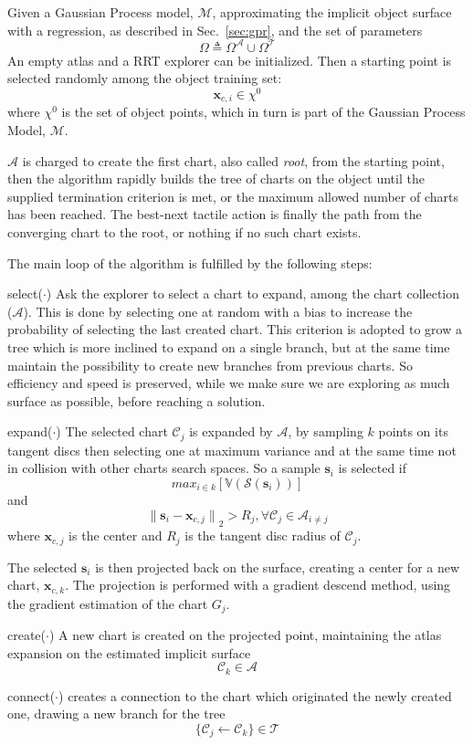 Given a Gaussian Process model, $\mathcal{M}$, approximating the implicit object surface
with a regression, as described in Sec.~\ref{sec:gpr}, and the set of parameters
$$\Omega \triangleq \Omega^{\mathcal{A}} \cup \Omega^{\mathcal{T}}$$
An empty atlas and a RRT explorer can be initialized.
Then a starting point is selected randomly among the object training set:
$$
\mathbf{x}_{c,i} \in \chi^0
$$
where $\chi^0$ is the set of object points,
which in turn is part of the Gaussian Process Model, $\mathcal{M}$.

$\mathcal{A}$ is charged to create the first chart, also called \emph{root}, from the starting point,
then the algorithm rapidly builds the tree of charts on the object until the supplied termination
criterion is met, or the maximum allowed number of charts has been reached.
The best-next tactile action is finally the path from the converging chart to the root, or nothing if no such chart exists.

The main loop of the algorithm is fulfilled by the following steps:\\
\begin{inparadesc}
\item[select($\cdot$)] Ask the explorer to select a chart to expand,
among the chart collection ($\mathcal{A}$).
This is done by selecting one at random with a bias to increase the probability
of selecting the last created chart. This criterion is adopted to grow a tree
which is more inclined to expand on a single branch, but at the same time maintain the
possibility to create new branches from previous charts. So efficiency and speed
is preserved, while we make sure we are exploring as much surface as possible,
before reaching a solution.\\
\item[expand($\cdot$)] The selected chart $\mathcal{C}_j$ is expanded by $\mathcal{A}$, by
sampling $k$ points on its tangent discs then selecting one at maximum variance
and at the same time not in collision with other charts search spaces. 
So a sample $\mathbf{s}_i$ is selected if 
$$
\mathit{max}_{i\in k}[\mathbb{V}(\mathcal{S}(\mathbf{s}_i))]
$$
and 
$$
{\parallel\mathbf{s}_i - \mathbf{x}_{c,j}\parallel}_{2} > R_j, \forall \mathcal{C}_j \in \mathcal{A}_{i \ne j}
$$
where $\mathbf{x}_{c,j}$ is the center and $R_j$ is the tangent disc radius of $\mathcal{C}_j$.

The selected $\mathbf{s}_i$ is then projected back on the surface,
creating a center for a new chart, $\mathbf{x}_{c,k}$.
The projection is performed with a gradient descend method, using the gradient estimation
of the chart $G_j$.\\
\item[create($\cdot$)] A new chart  is created on the projected point, maintaining the atlas
    expansion on the estimated implicit surface
$$
\mathcal{C}_k \in \mathcal{A}
$$
\item[connect($\cdot$)] creates a connection to the chart which originated the newly created one,
    drawing a new branch for the tree
$$
\{\mathcal{C}_j \leftarrow \mathcal{C}_k \} \in \mathcal{T}
$$
\end{inparadesc}

